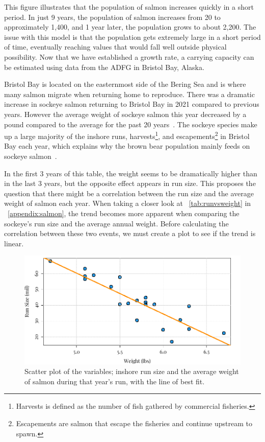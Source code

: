 This figure illustrates that the population of salmon increases quickly in a short period.
In just 9 years, the population of salmon increases from 20 to approximately 1,400, and 1 year later, the population grows to about 2,200. 
The issue with this model is that the population gets extremely large in a short period of time, eventually reaching values that would fall well outside physical possibility.
Now that we have established a growth rate, a carrying capacity can be estimated using data from the ADFG in Bristol Bay, Alaska.

Bristol Bay is located on the easternmost side of the Bering Sea and is where many salmon migrate when returning home to reproduce.
There was a dramatic increase in sockeye salmon returning to Bristol Bay in 2021 compared to previous years. However the average weight of sockeye salmon this year decreased by a pound compared to the average for the past 20 years~\cite{bristol}.
The sockeye species make up a large majority of the inshore runs, harvests\footnote{Harvests is defined as the number of fish gathered by commercial fisheries.}, and escapements\footnote{Escapements are salmon that escape the fisheries and continue upstream to spawn.} in Bristol Bay each year, which explains why the brown bear population mainly feeds on sockeye salmon~\cite{bristol}.

In the first 3 years of this table, the weight seems to be dramatically higher than in the last 3 years, but the opposite effect appears in run size.
This proposes the question that there might be a correlation between the run size and the average weight of salmon each year.
When taking a closer look at \tablename~\ref{tab:runvsweight} in \appendixname~\ref{appendix:salmon}, the trend becomes more apparent when comparing the sockeye's run size and the average annual weight.
Before calculating the correlation between these two events, we must create a plot to see if the trend is linear.
\begin{figure}[H]
    \centering
    \includegraphics[width=14cm]{Pictures/runVSweight/runVSweightNoTitle.png}
    \caption{\singlespacing
    Scatter plot of the variables; inshore run size and the average weight of salmon during that year's run, with the line of best fit.}
    \label{fig:runvsweight}
\end{figure}
